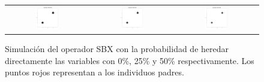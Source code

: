 \begin{figure}[t]%
\centering
\begin{tabular}{ccc}
   \includegraphics[width=0.3\textwidth]{Figures_Chapter6/DSBX_2D_First.png} &
   \includegraphics[width=0.3\textwidth]{Figures_Chapter6/DSBX_2D_Second.png} & 
   \includegraphics[width=0.3\textwidth]{Figures_Chapter6/DSBX_2D_Third.png} 
\end{tabular}
\caption{Simulación del operador SBX con la probabilidad de heredar directamente las variables con 0\%, 25\% y 50\% respectivamente. Los puntos rojos representan a los individuos padres.}
\label{fig:Simulations_TimeLine}
\end{figure}


